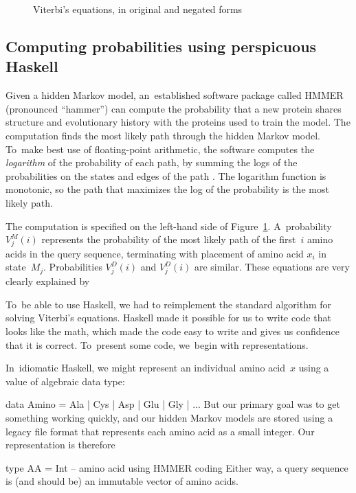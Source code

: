 \documentclass[preprint,nonatbib,blockstyle,nocopyrightspace,times]{sigplanconf}
\newcommand\figref[1]{Figure~\ref{#1}}
\newcommand\seclabel[1]{\label{sec:#1}}
\newenvironment{smallverbatim}{\par\small\verbatim}{\endverbatim}
\let\cite\citep
\begin{document}
\begin{figure}
\caption{Viterbi's equations, in original and negated forms}
\label{viterbi}
\end{figure}



\subsection{Computing probabilities using perspicuous Haskell}

\seclabel{viterbi}


Given a hidden Markov model, 
an~established software package called HMMER (pronounced ``hammer'') 
can compute the probability
that a new protein shares structure and
evolutionary history with the proteins used to train the model.
The computation finds the most likely path through the hidden Markov model.
To~make best use of floating-point arithmetic, the software computes
the \emph{logarithm} of the probability of each path, by summing
the logs of the 
probabilities on the states and edges of the path \cite{Viterbi:1967hq}.
The logarithm function is monotonic, so the path that maximizes the
log of the probability is the most likely path.

The computation is specified on the left-hand side of \figref{viterbi}.
A~probability $V_j^M(i)$ represents the probability of the most
likely path of the first~$i$ amino acids in the query sequence,
terminating with placement of amino acid $x_i$ in state~$M_j$.
Probabilities $V_j^D(i)$ and $V_j^D(i)$ are similar.
These
equations are very clearly explained by
\citet[Chapter~5]{Durbin:1998wz}


To~be able to use Haskell, we had to reimplement the standard
algorithm for solving Viterbi's equations.
Haskell made it possible for us to write code that looks like the
math,
which made the code easy to write and gives us confidence that it is
correct.
To~present some code,
we~begin with representations.

In~idiomatic Haskell, 
we might represent an individual amino acid~$x$
using a value of algebraic data type:
\begin{smallverbatim}
data Amino = Ala | Cys | Asp | Glu | Gly | ...
\end{smallverbatim}
But our primary goal was to get something working quickly,
and our hidden Markov models are stored using a
legacy file format that represents each amino acid as a small integer.
Our representation is therefore
\begin{smallverbatim}
type AA = Int -- amino acid using HMMER coding
\end{smallverbatim}
Either way, a query sequence is (and should be) an immutable vector of
amino acids.
\end{document}

